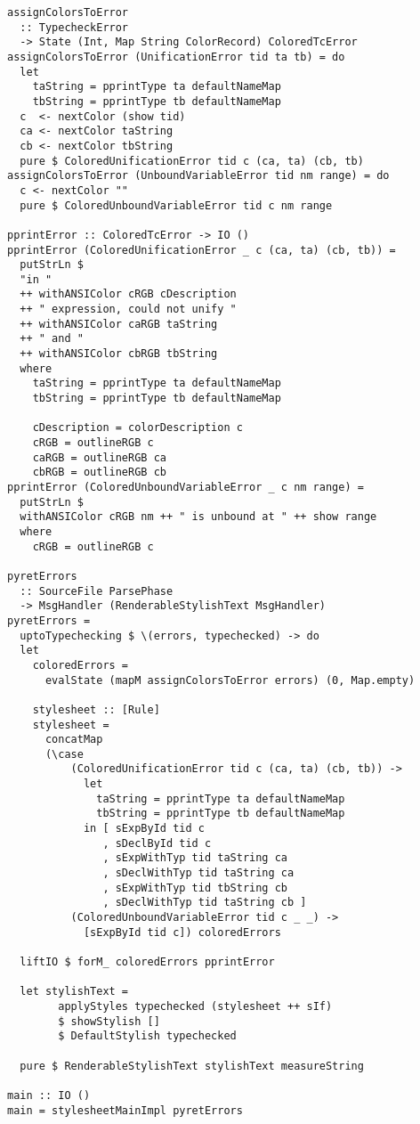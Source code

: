 \documentclass[acmsmall, screen]{acmart}
\begin{document}
{\begin{verbatim}
assignColorsToError
  :: TypecheckError
  -> State (Int, Map String ColorRecord) ColoredTcError
assignColorsToError (UnificationError tid ta tb) = do
  let
    taString = pprintType ta defaultNameMap
    tbString = pprintType tb defaultNameMap
  c  <- nextColor (show tid)
  ca <- nextColor taString
  cb <- nextColor tbString
  pure $ ColoredUnificationError tid c (ca, ta) (cb, tb)
assignColorsToError (UnboundVariableError tid nm range) = do
  c <- nextColor ""
  pure $ ColoredUnboundVariableError tid c nm range

pprintError :: ColoredTcError -> IO ()
pprintError (ColoredUnificationError _ c (ca, ta) (cb, tb)) =
  putStrLn $
  "in "
  ++ withANSIColor cRGB cDescription
  ++ " expression, could not unify "
  ++ withANSIColor caRGB taString
  ++ " and "
  ++ withANSIColor cbRGB tbString
  where
    taString = pprintType ta defaultNameMap
    tbString = pprintType tb defaultNameMap

    cDescription = colorDescription c
    cRGB = outlineRGB c
    caRGB = outlineRGB ca
    cbRGB = outlineRGB cb
pprintError (ColoredUnboundVariableError _ c nm range) =
  putStrLn $
  withANSIColor cRGB nm ++ " is unbound at " ++ show range
  where
    cRGB = outlineRGB c

pyretErrors
  :: SourceFile ParsePhase
  -> MsgHandler (RenderableStylishText MsgHandler)
pyretErrors =
  uptoTypechecking $ \(errors, typechecked) -> do
  let
    coloredErrors =
      evalState (mapM assignColorsToError errors) (0, Map.empty)

    stylesheet :: [Rule]
    stylesheet =
      concatMap
      (\case
          (ColoredUnificationError tid c (ca, ta) (cb, tb)) ->
            let
              taString = pprintType ta defaultNameMap
              tbString = pprintType tb defaultNameMap
            in [ sExpById tid c
               , sDeclById tid c
               , sExpWithTyp tid taString ca
               , sDeclWithTyp tid taString ca
               , sExpWithTyp tid tbString cb
               , sDeclWithTyp tid taString cb ]
          (ColoredUnboundVariableError tid c _ _) ->
            [sExpById tid c]) coloredErrors

  liftIO $ forM_ coloredErrors pprintError

  let stylishText =
        applyStyles typechecked (stylesheet ++ sIf)
        $ showStylish []
        $ DefaultStylish typechecked

  pure $ RenderableStylishText stylishText measureString

main :: IO ()
main = stylesheetMainImpl pyretErrors

\end{verbatim}}
\clearpage
\end{document}
